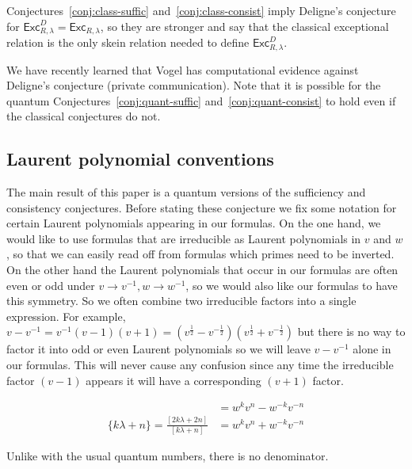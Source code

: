 \documentclass[12pt]{amsart}
\begin{document}
Conjectures~\ref{conj:class-suffic} and~\ref{conj:class-consist} imply
Deligne's conjecture for $\mathsf{Exc}^D_{R,\lambda} =
\mathsf{Exc}_{R,\lambda}$, so they are stronger and say that the
classical exceptional relation is the only skein relation needed to define
$\mathsf{Exc}^D_{R,\lambda}$.

\begin{remark}
  We have recently learned that Vogel has computational evidence against
  Deligne's conjecture (private communication). Note that it
  is possible for the quantum
  Conjectures~\ref{conj:quant-suffic} and~\ref{conj:quant-consist} to
  hold even if the classical conjectures do not.
\end{remark}

\subsection{Laurent polynomial conventions}

The main result of this paper is a quantum versions of the sufficiency and
consistency conjectures.   Before stating these conjecture we fix some
notation for certain Laurent polynomials appearing in our formulas.  On the
one hand, we would like to use formulas that are irreducible as Laurent
polynomials in $v$ and $w$, so that we can easily read off from formulas which
primes need to be inverted.  On the other hand the Laurent polynomials that
occur in our formulas are often even or odd under $v \rightarrow v^{-1}, w
\rightarrow w^{-1}$, so we would also like our formulas to have this symmetry.
So we often combine two irreducible factors into a single expression.  For
example, $v-v^{-1} = v^{-1}(v-1)(v+1) =
(v^{\frac{1}{2}}-v^{-\frac{1}{2}})(v^{\frac{1}{2}}+v^{-\frac{1}{2}})$ but
there is no way to factor it into odd or even Laurent polynomials so we will
leave $v-v^{-1}$ alone in our formulas.  This will never cause any confusion
since any time the irreducible factor $(v-1)$ appears it will have a
corresponding $(v+1)$ factor.

\begin{align*}
[k\lambda + n] &= w^kv^n - w^{-k}v^{-n}\\
\{k\lambda + n\} = \frac{[2k\lambda + 2n]}{[k\lambda + n]} &= w^k v^n + w^{-k} v^{-n}
\end{align*}

\begin{warning}
Unlike with the usual quantum numbers, there is no denominator.
\end{warning}
\end{document}
